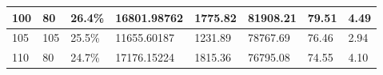 \documentclass[12pt]{UIdahoMastersThesis}
\begin{document}
\begin{table}[h!]
\begin{tabular}{|l|l|l|l|l|l|l|l|}
100                                                                                               & 80                                                                                                    & 26.4\%                                                                      & 16801.98762                                                                                    & 1775.82                                                                            & 81908.21                                                                            & 79.51              & 4.49                                                               \\ \hline
105                                                                                               & 105                                                                                                   & 25.5\%                                                                      & 11655.60187                                                                                    & 1231.89                                                                            & 78767.69                                                                            & 76.46              & 2.94                                                               \\ \hline
110                                                                                               & 80                                                                                                    & 24.7\%                                                                      & 17176.15224                                                                                    & 1815.36                                                                            & 76795.08                                                                            & 74.55              & 4.10                                                               \\ \hline
\end{tabular}
\end{table}


\end{document}

